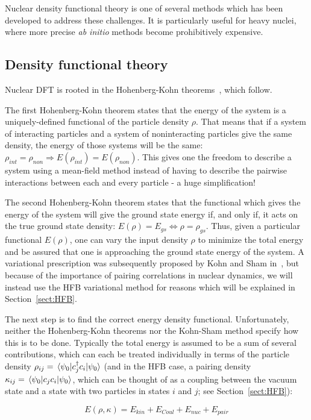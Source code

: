 Nuclear density functional theory is one of several methods which has been developed to address these challenges. It is particularly useful for heavy nuclei, where more precise \textit{ab initio} methods become prohibitively expensive.

\subsection{Density functional theory}\label{sect:DFT}
Nuclear DFT is rooted in the Hohenberg-Kohn theorems~\cite{Hohenberg1964}, which follow.

The first Hohenberg-Kohn theorem states that the energy of the system is a uniquely-defined functional of the particle density $\rho$. That means that if a system of interacting particles and a system of noninteracting particles give the same density, the energy of those systems will be the same: $\rho_{int}=\rho_{non} \Rightarrow E(\rho_{int})=E(\rho_{non})$. This gives one the freedom to describe a system using a mean-field method instead of having to describe the pairwise interactions between each and every particle - a huge simplification!

The second Hohenberg-Kohn theorem states that the functional which gives the energy of the system will give the ground state energy if, and only if, it acts on the true ground state density: $E(\rho)=E_{gs} \iff \rho = \rho_{gs}$. Thus, given a particular functional $E(\rho)$, one can vary the input density $\rho$ to minimize the total energy and be assured that one is approaching the ground state energy of the system. A variational prescription was subsequently proposed by Kohn and Sham in~\cite{Kohn1965}, but because of the importance of pairing correlations in nuclear dynamics, we will instead use the HFB variational method for reasons which will be explained in Section~\ref{sect:HFB}.

The next step is to find the correct energy density functional. Unfortunately, neither the Hohenberg-Kohn theorems nor the Kohn-Sham method specify how this is to be done. Typically the total energy is assumed to be a sum of several contributions, which can each be treated individually in terms of the particle density $\rho_{ij} = \expval{c_j^\dagger c_i}{\psi_0}$ (and in the HFB case, a pairing density $\kappa_{ij} = \expval{c_jc_i}{\psi_0}$, which can be thought of as a coupling between the vacuum state and a state with two particles in states $i$ and $j$; see Section~\ref{sect:HFB}):

\begin{equation}\label{eq:EDFterms}
E(\rho, \kappa) = E_{kin} + E_{Coul} + E_{nuc} + E_{pair}
\end{equation}

